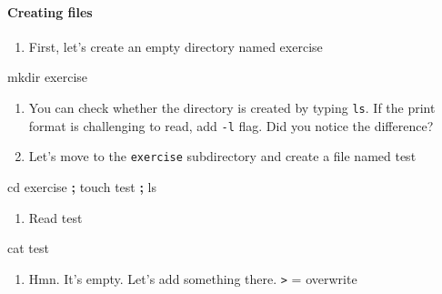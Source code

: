 \documentclass[
]{book}
\newenvironment{Shaded}{\begin{snugshade}}{\end{snugshade}}
\newcommand{\BuiltInTok}[1]{#1}
\newcommand{\FunctionTok}[1]{\textcolor[rgb]{0.00,0.00,0.00}{#1}}
\newcommand{\KeywordTok}[1]{\textcolor[rgb]{0.13,0.29,0.53}{\textbf{#1}}}
\newcommand{\NormalTok}[1]{#1}
\providecommand{\tightlist}{%
  \setlength{\itemsep}{0pt}\setlength{\parskip}{0pt}}
\begin{document}
\hypertarget{creating-files}{%
\paragraph{Creating files}\label{creating-files}}

\begin{enumerate}
\def\labelenumi{\arabic{enumi}.}
\tightlist
\item
  First, let's create an empty directory named exercise
\end{enumerate}

\begin{Shaded}
\begin{Highlighting}[]

\FunctionTok{mkdir}\NormalTok{ exercise }
\end{Highlighting}
\end{Shaded}

\begin{enumerate}
\def\labelenumi{\arabic{enumi}.}
\setcounter{enumi}{1}
\item
  You can check whether the directory is created by typing \texttt{ls}. If the print format is challenging to read, add \texttt{-l} flag. Did you notice the difference?
\item
  Let's move to the \texttt{exercise} subdirectory and create a file named test
\end{enumerate}

\begin{Shaded}
\begin{Highlighting}[]

\BuiltInTok{cd}\NormalTok{ exercise }\KeywordTok{;} \FunctionTok{touch}\NormalTok{ test }\KeywordTok{;} \FunctionTok{ls} 
\end{Highlighting}
\end{Shaded}

\begin{enumerate}
\def\labelenumi{\arabic{enumi}.}
\setcounter{enumi}{3}
\tightlist
\item
  Read test
\end{enumerate}

\begin{Shaded}
\begin{Highlighting}[]

\FunctionTok{cat}\NormalTok{ test }
\end{Highlighting}
\end{Shaded}

\begin{enumerate}
\def\labelenumi{\arabic{enumi}.}
\setcounter{enumi}{4}
\tightlist
\item
  Hmn. It's empty. Let's add something there. \texttt{\textgreater{}} = overwrite
\end{enumerate}
\end{document}
